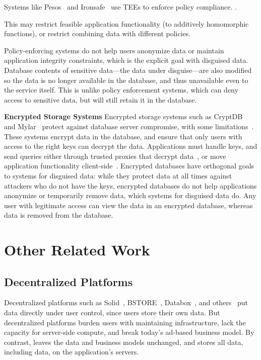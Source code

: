 %
Systems like Pesos~\cite{pesos} and Ironsafe~\cite{ironsafe} use TEEs to enforce policy compliance.
.
%


This may restrict feasible application functionality (\eg to additively
homomorphic functions), or restrict combining data with different policies.
%

%
Policy-enforcing systems do not help users anonymize data or maintain
application integrity constraints, which is the explicit goal with disguised
data.
%
Database contents of sensitive data---the data under disguise---are also
modified so the data is no longer available in the database, and thus
unavailable even to the service itself. This is unlike policy enforcement
systems, which can deny access to sensitive data, but will still retain it in
the database.
%

\textbf{Encrypted Storage Systems}
Encrypted storage systems such as CryptDB~\cite{cryptdb} and
Mylar~\cite{mylar} protect against database server compromise, with some
limitations~\cite{grubbs}.
%
These systems encrypt data in the database, and
ensure that only users with access to the right keys can decrypt the data.
%
Applications must handle keys, and send queries
either through trusted proxies that decrypt data~\cite{cryptdb}, or move
application functionality client-side~\cite{mylar}.
%
Encrypted databases have orthogonal goals to systems for disguised data: while they protect data at all times
against attackers who do not have the keys, encrypted databases do not help applications
anonymize or temporarily remove data, which systems for disguised data do.
%
Any user with legitimate access can view the data in an encrypted database,
whereas \xxed data is removed from the database.

\section{Other Related Work} 
\subsection{Decentralized Platforms} 
Decentralized platforms such as Solid~\cite{solid}, BSTORE~\cite{bstore},
Databox~\cite{databox}, and others~\cite{diy, amber, oort, w5, blockstack} put
data directly under user control, since users store their own data.
%
But decentralized platforms burden users with maintaining infrastructure, lack
the capacity for server-side compute, and break today's ad-based
business model.
%
By contrast, \sys leaves the data and business models unchanged,
and stores all data, including \xxed data, on the application's servers.
%

